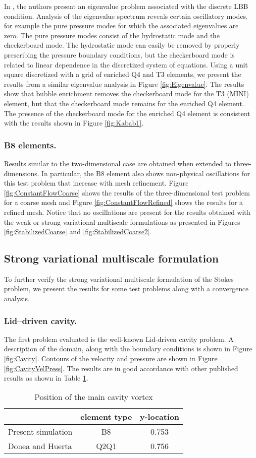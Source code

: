 \documentclass[11pt]{amsart}
\begin{document}
In \cite{Malkus, Griffiths, Gresho, Sani}, the authors present an eigenvalue problem associated with the discrete LBB condition.  Analysis of the eigenvalue spectrum reveals certain oscillatory modes, for example the pure pressure modes for which the associated eigenvalues are zero.  The pure pressure modes consist of the hydrostatic mode and the checkerboard mode.  The hydrostatic mode can easily be removed by properly prescribing the pressure boundary conditions, but the checkerboard mode is related to linear dependence in the discretized system of equations. Using a unit square discretized with a grid of  enriched Q4 and T3 elements, we present the results from a similar eigenvalue analysis in Figure \ref{fig:Eigenvalue}.  The results show that bubble enrichment removes the checkerboard mode for the T3 (MINI) element, but that the checkerboard mode remains for the enriched Q4 element.  The presence of the checkerboard mode for the enriched Q4 element is consistent with the results shown in Figure \ref{fig:Kabab1}.
\subsubsection{B8 elements.}
Results similar to the two-dimensional case are obtained when extended to three-dimensions.  In particular, the B8 element also shows non-physical oscillations for this test problem that increase with mesh refinement.  Figure \ref{fig:ConstantFlowCoarse} shows the results of the three-dimensional test problem for a coarse mesh and Figure \ref{fig:ConstantFlowRefined} shows the results for a refined mesh.  Notice that no oscillations are present for the results obtained with the weak or strong variational multiscale  formulations as presented in Figures \ref{fig:StabilizedCoarse} and \ref{fig:StabilizedCoarse2}.
\subsection{Strong variational multiscale formulation}
To further verify the strong variational multiscale formulation of the Stokes problem, we present the results for some test problems along with a convergence analysis.  
\subsubsection{Lid--driven cavity.}
The first problem evaluated is the well-known Lid-driven cavity problem.  A description of the domain, along with the boundary conditions is shown in Figure \ref{fig:Cavity}.
Contours of the velocity and pressure are shown in Figure \ref{fig:CavityVelPress}.  The results are in good accordance with other published results as shown in Table \ref{table:VortexLocation}.
\begin{table}[htb]
\caption{Position of the main cavity vortex}
\centering
\begin{tabular}{l c c }
\hline
  & element type & y-location  \\ [0.5ex]
\hline
Present simulation  & B8 & 0.753    \\
Donea and Huerta\cite{Donea} & Q2Q1 & 0.756 \\
\hline
\end{tabular}
\label{table:VortexLocation}
\end{table}
\end{document}
